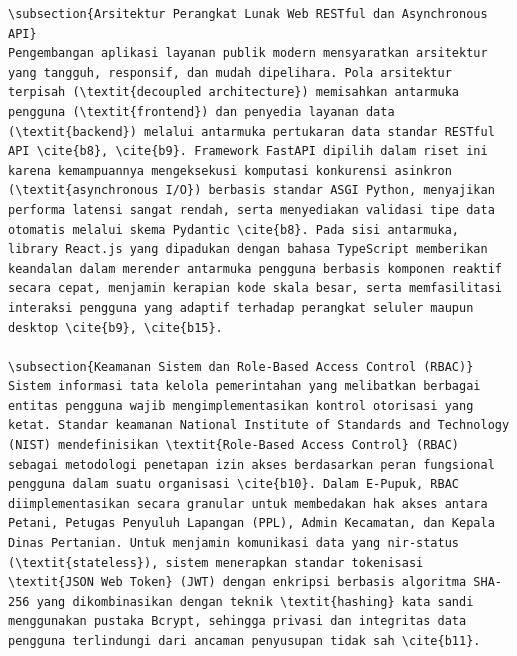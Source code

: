 \documentclass[conference]{IEEEtran}
\begin{document}
\begin{lstlisting}
\subsection{Arsitektur Perangkat Lunak Web RESTful dan Asynchronous API}
Pengembangan aplikasi layanan publik modern mensyaratkan arsitektur yang tangguh, responsif, dan mudah dipelihara. Pola arsitektur terpisah (\textit{decoupled architecture}) memisahkan antarmuka pengguna (\textit{frontend}) dan penyedia layanan data (\textit{backend}) melalui antarmuka pertukaran data standar RESTful API \cite{b8}, \cite{b9}. Framework FastAPI dipilih dalam riset ini karena kemampuannya mengeksekusi komputasi konkurensi asinkron (\textit{asynchronous I/O}) berbasis standar ASGI Python, menyajikan performa latensi sangat rendah, serta menyediakan validasi tipe data otomatis melalui skema Pydantic \cite{b8}. Pada sisi antarmuka, library React.js yang dipadukan dengan bahasa TypeScript memberikan keandalan dalam merender antarmuka pengguna berbasis komponen reaktif secara cepat, menjamin kerapian kode skala besar, serta memfasilitasi interaksi pengguna yang adaptif terhadap perangkat seluler maupun desktop \cite{b9}, \cite{b15}.

\subsection{Keamanan Sistem dan Role-Based Access Control (RBAC)}
Sistem informasi tata kelola pemerintahan yang melibatkan berbagai entitas pengguna wajib mengimplementasikan kontrol otorisasi yang ketat. Standar keamanan National Institute of Standards and Technology (NIST) mendefinisikan \textit{Role-Based Access Control} (RBAC) sebagai metodologi penetapan izin akses berdasarkan peran fungsional pengguna dalam suatu organisasi \cite{b10}. Dalam E-Pupuk, RBAC diimplementasikan secara granular untuk membedakan hak akses antara Petani, Petugas Penyuluh Lapangan (PPL), Admin Kecamatan, dan Kepala Dinas Pertanian. Untuk menjamin komunikasi data yang nir-status (\textit{stateless}), sistem menerapkan standar tokenisasi \textit{JSON Web Token} (JWT) dengan enkripsi berbasis algoritma SHA-256 yang dikombinasikan dengan teknik \textit{hashing} kata sandi menggunakan pustaka Bcrypt, sehingga privasi dan integritas data pengguna terlindungi dari ancaman penyusupan tidak sah \cite{b11}.


\end{lstlisting}
\end{document}
